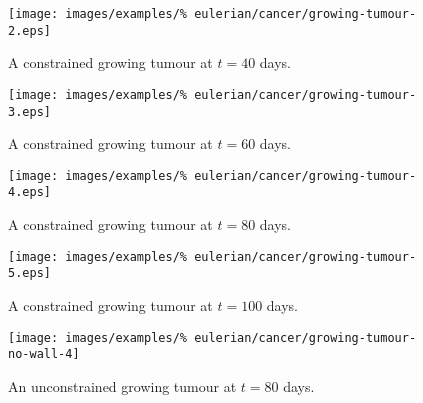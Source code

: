 \begin{figure}[!hptb]
  \centering
  \texttt{[image: images/examples/\%
    eulerian/cancer/growing-tumour-2.eps]}
  \caption{A constrained growing tumour at $t=40$ days.}
  \label{tumour-growth-constrained-2}
\end{figure}

\begin{figure}[!hptb]
  \centering
  \texttt{[image: images/examples/\%
    eulerian/cancer/growing-tumour-3.eps]}
  \caption{A constrained growing tumour at $t=60$ days.}
  \label{tumour-growth-constrained-3}
\end{figure}

\begin{figure}[!hptb]
  \centering
  \texttt{[image: images/examples/\%
    eulerian/cancer/growing-tumour-4.eps]}
  \caption{A constrained growing tumour at $t=80$ days.}
  \label{tumour-growth-constrained-4}
\end{figure}

\begin{figure}[!hptb]
  \centering
  \texttt{[image: images/examples/\%
    eulerian/cancer/growing-tumour-5.eps]}
  \caption{A constrained growing tumour at $t=100$ days.}
  \label{tumour-growth-constrained-5}
\end{figure}

\begin{figure}[!hptb]
  \centering
  \texttt{[image: images/examples/\%
    eulerian/cancer/growing-tumour-no-wall-4]}
  \caption{An unconstrained growing tumour at $t=80$ days.}
  \label{tumour-growth-no-wall-4}
\end{figure}

%

